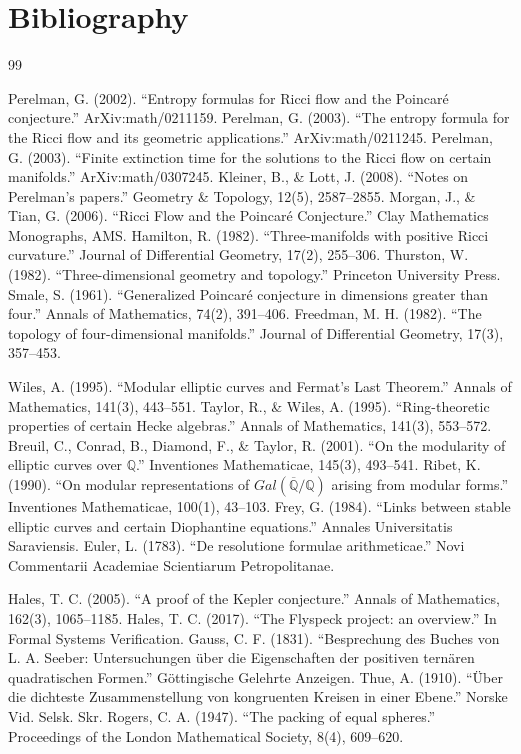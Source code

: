 \chapter*{Bibliography}
\begin{thebibliography}{99}

 Perelman, G. (2002). ``Entropy formulas for Ricci flow and the Poincar\'e conjecture.'' ArXiv:math/0211159.
 Perelman, G. (2003). ``The entropy formula for the Ricci flow and its geometric applications.'' ArXiv:math/0211245.
 Perelman, G. (2003). ``Finite extinction time for the solutions to the Ricci flow on certain manifolds.'' ArXiv:math/0307245.
 Kleiner, B., \& Lott, J. (2008). ``Notes on Perelman's papers.'' Geometry \& Topology, 12(5), 2587--2855.
 Morgan, J., \& Tian, G. (2006). ``Ricci Flow and the Poincar\'e Conjecture.'' Clay Mathematics Monographs, AMS.
 Hamilton, R. (1982). ``Three-manifolds with positive Ricci curvature.'' Journal of Differential Geometry, 17(2), 255--306.
 Thurston, W. (1982). ``Three-dimensional geometry and topology.'' Princeton University Press.
 Smale, S. (1961). ``Generalized Poincar\'e conjecture in dimensions greater than four.'' Annals of Mathematics, 74(2), 391--406.
 Freedman, M. H. (1982). ``The topology of four-dimensional manifolds.'' Journal of Differential Geometry, 17(3), 357--453.

 Wiles, A. (1995). ``Modular elliptic curves and Fermat's Last Theorem.'' Annals of Mathematics, 141(3), 443--551.
 Taylor, R., \& Wiles, A. (1995). ``Ring-theoretic properties of certain Hecke algebras.'' Annals of Mathematics, 141(3), 553--572.
 Breuil, C., Conrad, B., Diamond, F., \& Taylor, R. (2001). ``On the modularity of elliptic curves over $\mathbb{Q}$.'' Inventiones Mathematicae, 145(3), 493--541.
 Ribet, K. (1990). ``On modular representations of $Gal(\overline{\mathbb{Q}}/\mathbb{Q})$ arising from modular forms.'' Inventiones Mathematicae, 100(1), 43--103.
 Frey, G. (1984). ``Links between stable elliptic curves and certain Diophantine equations.'' Annales Universitatis Saraviensis.
 Euler, L. (1783). ``De resolutione formulae arithmeticae.'' Novi Commentarii Academiae Scientiarum Petropolitanae.

 Hales, T. C. (2005). ``A proof of the Kepler conjecture.'' Annals of Mathematics, 162(3), 1065--1185.
 Hales, T. C. (2017). ``The Flyspeck project: an overview.'' In Formal Systems Verification.
 Gauss, C. F. (1831). ``Besprechung des Buches von L. A. Seeber: Untersuchungen \"{u}ber die Eigenschaften der positiven tern\"aren quadratischen Formen.'' G\"ottingische Gelehrte Anzeigen.
 Thue, A. (1910). ``\"Uber die dichteste Zusammenstellung von kongruenten Kreisen in einer Ebene.'' Norske Vid. Selsk. Skr.
 Rogers, C. A. (1947). ``The packing of equal spheres.'' Proceedings of the London Mathematical Society, 8(4), 609--620.


\end{thebibliography}
